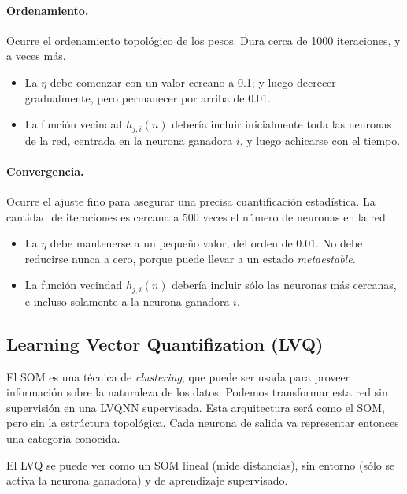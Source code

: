 \documentclass[10pt,a4paper]{article}
\begin{document}
\begin{multicols}{2}
\paragraph{Ordenamiento.} Ocurre el ordenamiento topológico de los pesos. Dura cerca de 1000 iteraciones, y a veces más.
\begin{itemize}
\item La $\eta$ debe comenzar con un valor cercano a 0.1; y luego decrecer gradualmente, pero permanecer por arriba de 0.01.
\item La función vecindad $h_{j,i}(n)$ debería incluir inicialmente toda las neuronas de la red, centrada en la neurona ganadora $i$, y luego achicarse con el tiempo.
\end{itemize}

\paragraph{Convergencia.} Ocurre el ajuste fino para asegurar una precisa cuantificación estadística. La cantidad de iteraciones es cercana a 500 veces el número de neuronas en la red.
\begin{itemize}
\item La $\eta$ debe mantenerse a un pequeño valor, del orden de 0.01. No debe reducirse nunca a cero, porque puede llevar a un estado \textit{metaestable}.
\item La función vecindad $h_{j,i}(n)$ debería incluir sólo las neuronas más cercanas, e incluso solamente a la neurona ganadora $i$.
\end{itemize}
\end{multicols}

\subsection{Learning Vector Quantifization (LVQ)}
El SOM es una técnica de \textit{clustering}, que puede ser usada para proveer información sobre la naturaleza de los datos. Podemos transformar esta red sin supervisión en una LVQNN supervisada. Esta arquitectura será como el SOM, pero sin la estrúctura topológica. Cada neurona de salida va representar entonces una categoría conocida.

El LVQ se puede ver como un SOM lineal (mide distancias), sin entorno (sólo se activa la neurona ganadora) y de aprendizaje supervisado.
\end{document}
